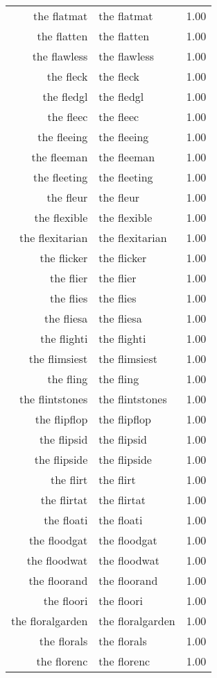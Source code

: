 \begin{table}[ht]
\begin{tabular}{rlr}
  the flatmat & the flatmat & 1.00 \\ 
  the flatten & the flatten & 1.00 \\ 
  the flawless & the flawless & 1.00 \\ 
  the fleck & the fleck & 1.00 \\ 
  the fledgl & the fledgl & 1.00 \\ 
  the fleec & the fleec & 1.00 \\ 
  the fleeing & the fleeing & 1.00 \\ 
  the fleeman & the fleeman & 1.00 \\ 
  the fleeting & the fleeting & 1.00 \\ 
  the fleur & the fleur & 1.00 \\ 
  the flexible & the flexible & 1.00 \\ 
  the flexitarian & the flexitarian & 1.00 \\ 
  the flicker & the flicker & 1.00 \\ 
  the flier & the flier & 1.00 \\ 
  the flies & the flies & 1.00 \\ 
  the fliesa & the fliesa & 1.00 \\ 
  the flighti & the flighti & 1.00 \\ 
  the flimsiest & the flimsiest & 1.00 \\ 
  the fling & the fling & 1.00 \\ 
  the flintstones & the flintstones & 1.00 \\ 
  the flipflop & the flipflop & 1.00 \\ 
  the flipsid & the flipsid & 1.00 \\ 
  the flipside & the flipside & 1.00 \\ 
  the flirt & the flirt & 1.00 \\ 
  the flirtat & the flirtat & 1.00 \\ 
  the floati & the floati & 1.00 \\ 
  the floodgat & the floodgat & 1.00 \\ 
  the floodwat & the floodwat & 1.00 \\ 
  the floorand & the floorand & 1.00 \\ 
  the floori & the floori & 1.00 \\ 
  the floralgarden & the floralgarden & 1.00 \\ 
  the florals & the florals & 1.00 \\ 
  the florenc & the florenc & 1.00 \\ 

\end{tabular}
\end{table}
